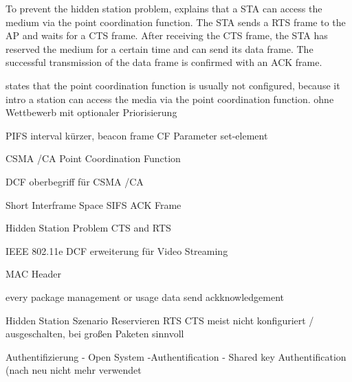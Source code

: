To prevent the hidden station problem, \textcite{sauter_wireless_2022} explains that a \ac{STA} can access the medium
via the point coordination function.
The \ac{STA} sends a \ac{RTS} frame to the \ac{AP} and waits for a \ac{CTS} frame.
After receiving the \ac{CTS} frame, the \ac{STA} has reserved the medium for a certain time and can send its data frame.
The successful transmission of the data frame is confirmed with an \ac{ACK} frame.

\textcite{sauter_wireless_2022} states that the point coordination function is usually not configured, because it intro
a station can access the media via the point coordination function.  ohne Wettbewerb mit optionaler Priorisierung

PIFS interval kürzer,
beacon frame
CF Parameter set-element

CSMA /CA
Point Coordination Function

\textcite{sauter_wireless_2022}
DCF oberbegriff für CSMA /CA


Short Interframe Space SIFS ACK Frame

Hidden Station Problem
CTS and RTS

IEEE 802.11e DCF erweiterung für Video Streaming



MAC Header


\textcite{sauter_wireless_2022}
every package management or usage data send ackknowledgement

Hidden Station Szenario
Reservieren
RTS CTS
meist nicht konfiguriert / ausgeschalten, bei großen Paketen sinnvoll



Authentifizierung
- Open System -Authentification
- Shared key Authentification
(nach neu nicht mehr verwendet